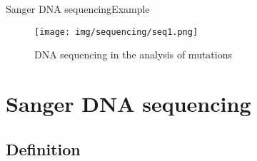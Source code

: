 \documentclass[10pt]{beamer}
\newcommand{\1}{
	\setbeamertemplate{background}{
		\texttt{[image: img/1]}
		\tikz[overlay] \fill[fill opacity=0.75,fill=white] (0,0) rectangle (-\paperwidth,\paperheight);
	}
}
\begin{document}
\begin{frame}{Sanger DNA sequencing}{Example}
	\begin{figure}[]
		\centering
		\texttt{[image: img/sequencing/seq1.png]}
		\label{img:mot2}
		\caption{DNA sequencing in the analysis of mutations}
	\end{figure}
\end{frame}

\section{Sanger DNA sequencing}





\subsection{Definition}
\end{document}
